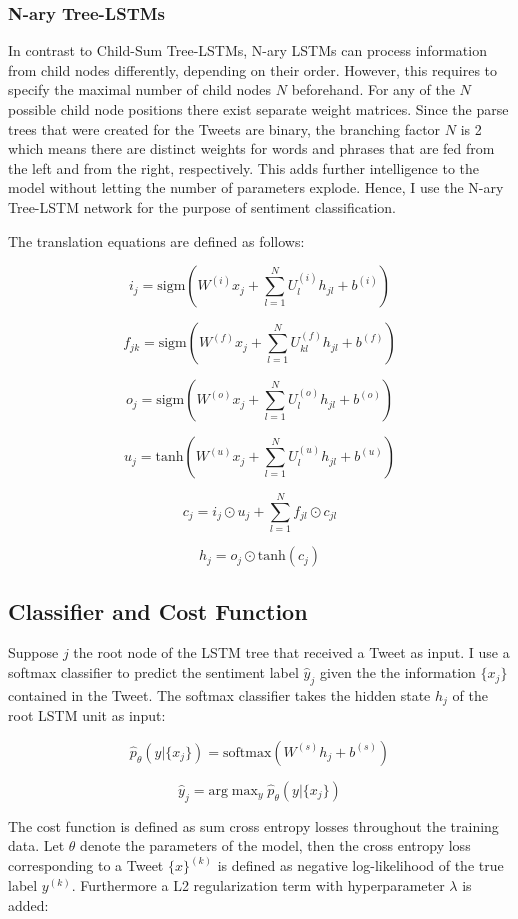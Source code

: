 \documentclass[a4paper,12pt]{article}%
\begin{document}
\subsubsection{N-ary Tree-LSTMs}
In contrast to Child-Sum Tree-LSTMs, N-ary LSTMs can process information from child nodes differently, depending on their order. However, this requires to specify the maximal number of child nodes $N$ beforehand. For any of the $N$ possible child node positions there exist separate weight matrices. Since the parse trees that were created for the Tweets are binary, the branching factor $N$ is 2 which means there are distinct weights for words and phrases that are fed from the left and from the right, respectively. This adds further intelligence to the model without letting the number of parameters explode. Hence, I use the N-ary Tree-LSTM network for the purpose of  sentiment classification. 

The translation equations are defined as follows:


$$
i_j = \text{sigm} \left( W^{(i)} x_j + \sum_{l=1}^N U_l^{(i)} h_{jl} + b^{(i)} \right) 
$$

$$
f_{jk} = \text{sigm} \left( W^{(f)} x_j + \sum_{l=1}^N U_{kl}^{(f)} h_{jl} + b^{(f)} \right) 
$$

$$
o_j = \text{sigm} \left( W^{(o)} x_j + \sum_{l=1}^N U_{l}^{(o)} h_{jl} + b^{(o)} \right) 
$$

$$
u_j = \text{tanh} \left( W^{(u)} x_j +\sum_{l=1}^N U_{l}^{(u)} h_{jl} + b^{(u)} \right)
$$

$$
c_j = i_j \odot u_j + \sum_{l=1}^N f_{jl} \odot c_{jl}
$$

$$
h_j = o_j \odot \text{tanh}(c_j)
$$

\subsection{Classifier and Cost Function}
Suppose $j$ the root node of the LSTM tree that received a Tweet as input. I use a softmax classifier to predict the sentiment label $\hat{y}_j$ given the the information $\{x_j\}$ contained in the Tweet. The softmax classifier takes the hidden state $h_j$ of the root LSTM unit as input:

$$
\hat{p}_{\theta} \left(y | \{x_j\} \right) = \text{softmax} \left( W^{(s)} h_j + b^{(s)} \right)
$$

$$
\hat{y}_j = \text{arg} \mathop{\text{max}}_{y} \hat{p}_{\theta} \left(y | \{x_j\} \right)
$$


The cost function is defined as sum cross entropy losses throughout the training data. Let $\theta$ denote the parameters of the model, then the cross entropy loss corresponding to a Tweet $\{x\}^{(k)}$ is defined as negative log-likelihood of the true label $y^{(k)}$. Furthermore a L2 regularization term with hyperparameter $\lambda$ is added:
\end{document}
